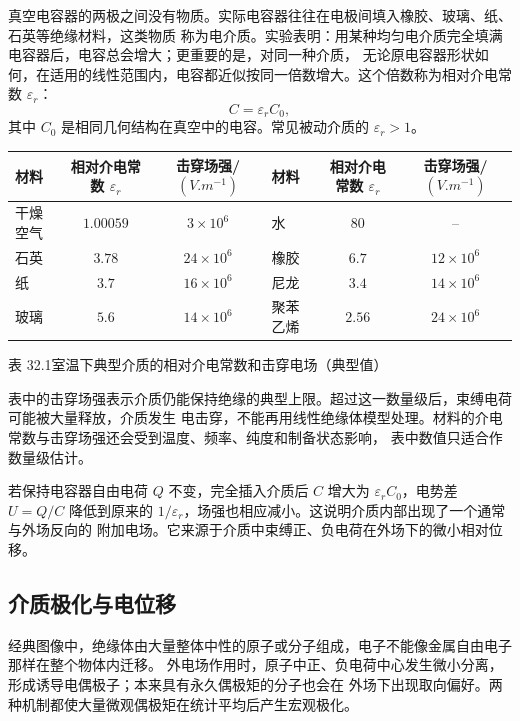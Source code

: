 真空电容器的两极之间没有物质。实际电容器往往在电极间填入橡胶、玻璃、纸、石英等绝缘材料，这类物质
称为电介质。实验表明：用某种均匀电介质完全填满电容器后，电容总会增大；更重要的是，对同一种介质，
无论原电容器形状如何，在适用的线性范围内，电容都近似按同一倍数增大。这个倍数称为相对介电常数
$\varepsilon_r$：
\begin{equation}
  \boxed{C=\varepsilon_rC_0},
\end{equation}
其中 $C_0$ 是相同几何结构在真空中的电容。常见被动介质的 $\varepsilon_r>1$。

\dielectricExperimentDiagram

\begin{center}
\small
\begin{tabular}{lcc lcc}
\toprule
材料 & 相对介电常数 $\varepsilon_r$ & 击穿场强/$(\si{V.m^{-1}})$ &
材料 & 相对介电常数 $\varepsilon_r$ & 击穿场强/$(\si{V.m^{-1}})$\\
\midrule
干燥空气 & $1.00059$ & $3\times10^6$ & 水 & $80$ & --\\
石英 & $3.78$ & $24\times10^6$ & 橡胶 & $6.7$ & $12\times10^6$\\
纸 & $3.7$ & $16\times10^6$ & 尼龙 & $3.4$ & $14\times10^6$\\
玻璃 & $5.6$ & $14\times10^6$ & 聚苯乙烯 & $2.56$ & $24\times10^6$\\
\bottomrule
\end{tabular}

{\small\color{TextGray}表 32.1\quad 室温下典型介质的相对介电常数和击穿电场（典型值）}
\end{center}

表中的击穿场强表示介质仍能保持绝缘的典型上限。超过这一数量级后，束缚电荷可能被大量释放，介质发生
电击穿，不能再用线性绝缘体模型处理。材料的介电常数与击穿场强还会受到温度、频率、纯度和制备状态影响，
表中数值只适合作数量级估计。

若保持电容器自由电荷 $Q$ 不变，完全插入介质后 $C$ 增大为 $\varepsilon_rC_0$，电势差
$U=Q/C$ 降低到原来的 $1/\varepsilon_r$，场强也相应减小。这说明介质内部出现了一个通常与外场反向的
附加电场。它来源于介质中束缚正、负电荷在外场下的微小相对位移。

\subsection*{介质极化与电位移}

经典图像中，绝缘体由大量整体中性的原子或分子组成，电子不能像金属自由电子那样在整个物体内迁移。
外电场作用时，原子中正、负电荷中心发生微小分离，形成诱导电偶极子；本来具有永久偶极矩的分子也会在
外场下出现取向偏好。两种机制都使大量微观偶极矩在统计平均后产生宏观极化。

